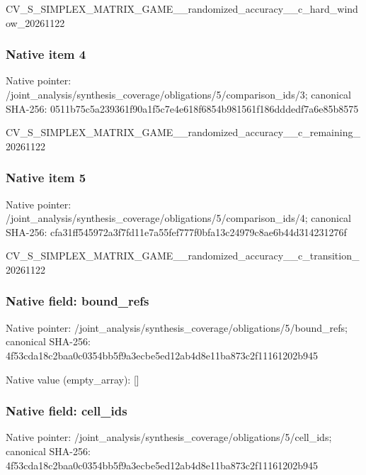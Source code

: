 \documentclass[10pt,a4paper]{article}
\begin{document}
CV\_S\_SIMPLEX\_MATRIX\_GAME\allowbreak{}\_\_randomized\_accuracy\_\_c\allowbreak{}\_hard\_window\_20261122


\subsubsection{Native item 4}


Native pointer: /joint\_analysis/synthesi\allowbreak{}s\_coverage/obligations/5\allowbreak{}/comparison\_ids/3; canonical SHA-256: 0511b75c5a239361f90a1f5c\allowbreak{}7e4e618f6854b981561f186d\allowbreak{}ddedf7a6e85b8575


CV\_S\_SIMPLEX\_MATRIX\_GAME\allowbreak{}\_\_randomized\_accuracy\_\_c\allowbreak{}\_remaining\_20261122


\subsubsection{Native item 5}


Native pointer: /joint\_analysis/synthesi\allowbreak{}s\_coverage/obligations/5\allowbreak{}/comparison\_ids/4; canonical SHA-256: cfa31ff545972a3f7fd11e7a\allowbreak{}55fef777f0bfa13c24979c8a\allowbreak{}e6b44d314231276f


CV\_S\_SIMPLEX\_MATRIX\_GAME\allowbreak{}\_\_randomized\_accuracy\_\_c\allowbreak{}\_transition\_20261122


\subsubsection{Native field: bound\_refs}


Native pointer: /joint\_analysis/synthesi\allowbreak{}s\_coverage/obligations/5\allowbreak{}/bound\_refs; canonical SHA-256: 4f53cda18c2baa0c0354bb5f\allowbreak{}9a3ecbe5ed12ab4d8e11ba87\allowbreak{}3c2f11161202b945



Native value (empty\_array): []



\subsubsection{Native field: cell\_ids}


Native pointer: /joint\_analysis/synthesi\allowbreak{}s\_coverage/obligations/5\allowbreak{}/cell\_ids; canonical SHA-256: 4f53cda18c2baa0c0354bb5f\allowbreak{}9a3ecbe5ed12ab4d8e11ba87\allowbreak{}3c2f11161202b945
\end{document}
